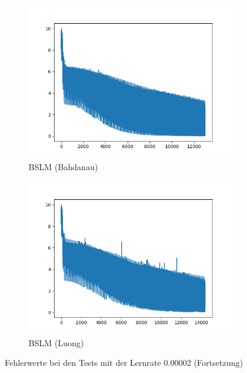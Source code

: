 \begin{figure}[H]
	\centering
	\begin{subfigure}[b]{\textwidth}
		\centering
		\includegraphics[scale=0.55]{images/bslm_bahdanau_2e_5_100EP_v4.png}
		\caption{BSLM (Bahdanau)}
		\label{BNMT_Bahdanau_lr2e-5}
	\end{subfigure}
	\begin{subfigure}[b]{\textwidth}
		\centering
		\includegraphics[scale=0.55]{images/bslm_luong_100EP_2e-5_V4.png}
		\caption{BSLM (Luong)}
		\label{BNMT_Luong_lr2e-5}
	\end{subfigure}
	
	\caption{Fehlerwerte bei den Tests mit der Lernrate 0.00002 (Fortsetzung)}
	\label{fig:lr_00002}
\end{figure}


